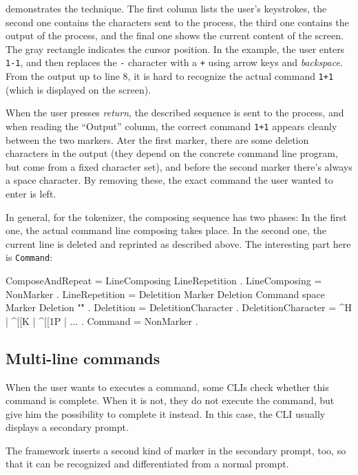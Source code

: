\documentclass[paper=a4,twoside,abstract=on,cleardoublepage=empty,numbers=noenddot,toc=bib,12pt,appendixprefix=true]{scrreprt}
\begin{document}
 demonstrates the technique. The first column lists the user's keystrokes, the second one contains the characters sent to the process, the third one contains the output of the process, and the final one shows the current content of the screen. The gray rectangle indicates the cursor position. In the example, the user enters \texttt{1-1}, and then replaces the \texttt{-} character with a \texttt{+} using arrow keys and \emph{backspace}. From the output up to line 8, it is hard to recognize the actual command \texttt{1+1} (which is displayed on the screen). 

When the user presses \emph{return}, the described sequence is sent to the process, and when reading the “Output” column, the correct command \texttt{1+1} appears cleanly between the two markers. Ater the first marker, there are some deletion characters in the output (they depend on the concrete command line program, but come from a fixed character set), and before the second marker there's always a space character. By removing these, the exact command the user wanted to enter is left.

In general, for the tokenizer, the composing sequence has two phases: In the first one, the actual command line composing takes place. In the second one, the current line is deleted and reprinted as described above. The interesting part here is \texttt{Command}:

\begin{ebnf}
ComposeAndRepeat = LineComposing LineRepetition .
LineComposing = { NonMarker } .
LineRepetition = Deletition Marker Deletion Command
    space Marker Deletion "\r" .
Deletition = { DeletitionCharacter } .
DeletitionCharacter = ^H | ^[[K | ^[[1P | ... .
Command = { NonMarker } .
\end{ebnf}

\subsection*{Multi-line commands}

When the user wants to executes a command, some \textsc{CLI}s check whether this command is complete. When it is not, they do not execute the command, but give him the possibility to complete it instead. In this case, the CLI usually displays a secondary prompt.


The framework inserts a second kind of marker in the secondary prompt, too, so that it can be recognized and differentiated from a normal prompt.
\end{document}
